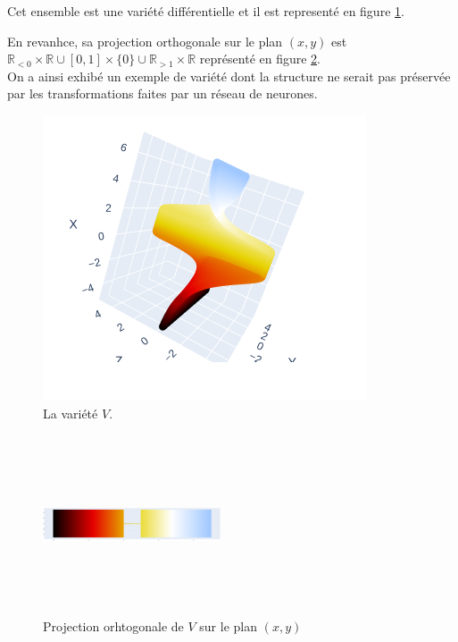 \documentclass[11pt,a4paper]{article}
\newcommand{\R}{\ensuremath{\mathbb{R}}}
\begin{document}
Cet ensemble est une variété différentielle et il est representé en figure \ref{fig:variete_ex}.

En revanhce, sa projection orthogonale sur le plan $(x,y)$ est $\R_{<0} \times \R \cup [0,1] \times \{0\} \cup \R_{>1} \times \R$ représenté en figure \ref{fig:variete_proj}.
\\

On a ainsi exhibé un exemple de variété dont la structure ne serait pas préservée par les transformations faites par un réseau de neurones.


\begin{figure}
	\centering
	\label{fig:variete_ex}
	\caption{La variété $V$.}
	\includegraphics[scale=0.5]{manifold_ex.png}
\end{figure}

\begin{figure}
	\centering
	\label{fig:variete_proj}
	\caption{Projection orhtogonale de $V$ sur le plan $(x,y)$}
	\includegraphics[width=150pt, height=150pt]{projected_manifold.png}
\end{figure}
\end{document}
